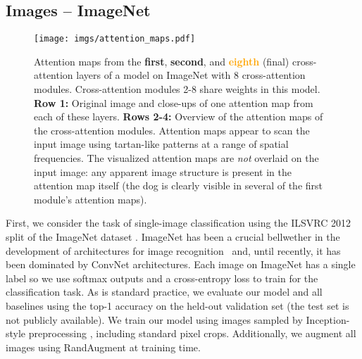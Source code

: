 \documentclass{article}
\begin{document}
\subsection{Images -- ImageNet}

\begin{figure*}
    \centering
    \texttt{[image: imgs/attention\_maps.pdf]}
    \vspace{-12pt}
    \caption{Attention maps from the \textbf{\textcolor{my_blue}{first}}, \textbf{\textcolor{my_green}{second}}, and \textbf{\textcolor{orange}{eighth}} (final) cross-attention layers of a model on ImageNet with 8 cross-attention modules. Cross-attention modules 2-8 share weights in this model. \textbf{Row 1:} Original image and close-ups of one attention map from each of these layers. \textbf{Rows 2-4:} Overview of the attention maps of the cross-attention modules. Attention maps appear to scan the input image using tartan-like patterns at a range of spatial frequencies. The visualized attention maps are \textit{not} overlaid on the input image: any apparent image structure is present in the attention map itself (the dog is clearly visible in several of the first module's attention maps).}
    \label{fig:attention_map}
    \vspace{-12pt}
\end{figure*}

First, we consider the task of single-image classification using the ILSVRC 2012 split of the ImageNet dataset \cite{deng2009imagenet}. ImageNet has been a crucial bellwether in the development of architectures for image recognition~\cite{krizhevsky2012imagenet,simonyan2014very,szegedy2015going,he2016deep} and, until recently, it has been dominated by ConvNet architectures. Each image on ImageNet has a single label so we use softmax outputs and a cross-entropy loss to train for the classification task. As is standard practice, we evaluate our model and all baselines using the top-1 accuracy on the held-out validation set (the test set is not publicly available). We train our model using images sampled by Inception-style preprocessing \cite{szegedy2015going}, including standard  pixel crops. Additionally, we augment all images using RandAugment \cite{cubuk2020randaugment} at training time.
\end{document}
